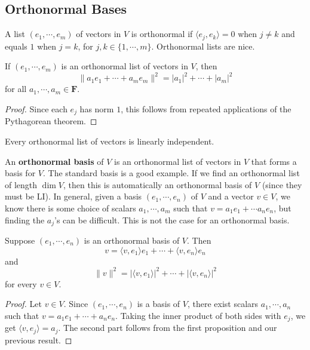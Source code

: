 \subsection{Orthonormal Bases}
A list $(e_1,\cdots ,e_m)$ of vectors in $V$ is orthonormal if $\langle e_j ,e_k \rangle =0$ when $j\neq k$ and equals $1$ when $j=k$, for $j,k\in \{1,\cdots ,m\} $. Orthonormal lists are nice.
\begin{prop}
    If $(e_1,\cdots ,e_m)$ is an orthonormal list of vectors in $V$, then \[
        \|a_1e_1+\cdots +a_me_m\|^2=|a_1|^2+\cdots +|a_m|^2
    \] for all $a_1,\cdots ,a_m\in \mathbf F$.
\end{prop}
\begin{proof}
    Since each $e_j $ has norm $1$, this follows from repeated applications of the Pythagorean theorem.
\end{proof}
\begin{cor}
    Every orthonormal list of vectors is linearly independent.
\end{cor}
An \textbf{orthonormal basis} of $V$ is an orthonormal list of vectors in $V$ that forms a basis for $V$. The standard basis is a good example. If we find an orthonormal list of length $\dim V $, then this is automatically an orthonormal basis of $V$ (since they must be LI). In general, given a basis $(e_1,\cdots ,e_n )$ of $V$ and a vector $v\in V$, we know there is some choice of scalars $a_1,\cdots ,a_m$ such that $v=a_1e_1+\cdots a_n e_n $, but finding the $a_j $'s can be difficult. This is not the case for an orthonormal basis.
\begin{theorem}
    Suppose $(e_1,\cdots ,e_n )$ is an orthonormal basis of $V$. Then \[
    v=\langle v,e_1 \rangle e_1+\cdots +\langle v,e_n  \rangle e_n 
    \] and \[
    \|v\|^2=| \langle v,e_1 \rangle |^2+\cdots +|\langle v,e_n  \rangle |^2
    \] for every $v\in V$.
\end{theorem}
\begin{proof}
    Let $v\in V$. Since $(e_1,\cdots ,e_n )$ is a basis of $V$, there exist scalars $a_1,\cdots ,a_n $ such that $v=a_1e_1+\cdots +a_n e_n $. Taking the inner product of both sides with $e_j $, we get $\langle v,e_j  \rangle =a_j $. The second part follows from the first proposition and our previous result.
\end{proof}
